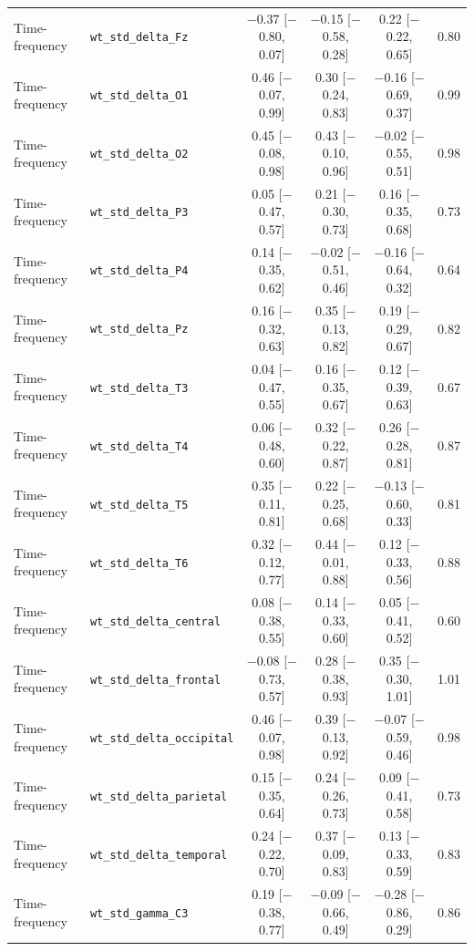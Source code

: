 {\begin{longtable}{llcccc}
Time-frequency & \texttt{wt\_std\_delta\_Fz} & $-$0.37 [$-$0.80, 0.07] & $-$0.15 [$-$0.58, 0.28] & 0.22 [$-$0.22, 0.65] & 0.80 \\
Time-frequency & \texttt{wt\_std\_delta\_O1} & 0.46 [$-$0.07, 0.99] & 0.30 [$-$0.24, 0.83] & $-$0.16 [$-$0.69, 0.37] & 0.99 \\
Time-frequency & \texttt{wt\_std\_delta\_O2} & 0.45 [$-$0.08, 0.98] & 0.43 [$-$0.10, 0.96] & $-$0.02 [$-$0.55, 0.51] & 0.98 \\
Time-frequency & \texttt{wt\_std\_delta\_P3} & 0.05 [$-$0.47, 0.57] & 0.21 [$-$0.30, 0.73] & 0.16 [$-$0.35, 0.68] & 0.73 \\
Time-frequency & \texttt{wt\_std\_delta\_P4} & 0.14 [$-$0.35, 0.62] & $-$0.02 [$-$0.51, 0.46] & $-$0.16 [$-$0.64, 0.32] & 0.64 \\
Time-frequency & \texttt{wt\_std\_delta\_Pz} & 0.16 [$-$0.32, 0.63] & 0.35 [$-$0.13, 0.82] & 0.19 [$-$0.29, 0.67] & 0.82 \\
Time-frequency & \texttt{wt\_std\_delta\_T3} & 0.04 [$-$0.47, 0.55] & 0.16 [$-$0.35, 0.67] & 0.12 [$-$0.39, 0.63] & 0.67 \\
Time-frequency & \texttt{wt\_std\_delta\_T4} & 0.06 [$-$0.48, 0.60] & 0.32 [$-$0.22, 0.87] & 0.26 [$-$0.28, 0.81] & 0.87 \\
Time-frequency & \texttt{wt\_std\_delta\_T5} & 0.35 [$-$0.11, 0.81] & 0.22 [$-$0.25, 0.68] & $-$0.13 [$-$0.60, 0.33] & 0.81 \\
Time-frequency & \texttt{wt\_std\_delta\_T6} & 0.32 [$-$0.12, 0.77] & 0.44 [$-$0.01, 0.88] & 0.12 [$-$0.33, 0.56] & 0.88 \\
Time-frequency & \texttt{wt\_std\_delta\_central} & 0.08 [$-$0.38, 0.55] & 0.14 [$-$0.33, 0.60] & 0.05 [$-$0.41, 0.52] & 0.60 \\
Time-frequency & \texttt{wt\_std\_delta\_frontal} & $-$0.08 [$-$0.73, 0.57] & 0.28 [$-$0.38, 0.93] & 0.35 [$-$0.30, 1.01] & 1.01 \\
Time-frequency & \texttt{wt\_std\_delta\_occipital} & 0.46 [$-$0.07, 0.98] & 0.39 [$-$0.13, 0.92] & $-$0.07 [$-$0.59, 0.46] & 0.98 \\
Time-frequency & \texttt{wt\_std\_delta\_parietal} & 0.15 [$-$0.35, 0.64] & 0.24 [$-$0.26, 0.73] & 0.09 [$-$0.41, 0.58] & 0.73 \\
Time-frequency & \texttt{wt\_std\_delta\_temporal} & 0.24 [$-$0.22, 0.70] & 0.37 [$-$0.09, 0.83] & 0.13 [$-$0.33, 0.59] & 0.83 \\
Time-frequency & \texttt{wt\_std\_gamma\_C3} & 0.19 [$-$0.38, 0.77] & $-$0.09 [$-$0.66, 0.49] & $-$0.28 [$-$0.86, 0.29] & 0.86 \\

\end{longtable}}
